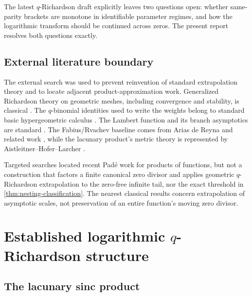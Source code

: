 \documentclass[11pt,oneside]{article}
\numberwithin{equation}{section}
\theoremstyle{frontier}
\theoremstyle{definition}
\theoremstyle{remark}
\begin{document}
\begin{resultbox}
The latest $q$-Richardson draft explicitly leaves two questions open: whether same-parity
brackets are monotone in identifiable parameter regimes, and how the logarithmic transform
should be continued across zeros.  The present report resolves both questions exactly.
\end{resultbox}

\subsection{External literature boundary}\label{sec:literature}

The external search was used to prevent reinvention of standard extrapolation theory and to
locate adjacent product-approximation work.  Generalized Richardson theory on geometric
meshes, including convergence and stability, is classical \cite{sidi1996,sidi-siam}.  The
$q$-binomial identities used to write the weights belong to standard basic hypergeometric
calculus \cite{gasper-rahman}.  The Lambert function and its branch asymptotics are standard
\cite{corless}.  The Fabius/Rvachev baseline comes from Arias de Reyna and related work
\cite{arias-function,arias-arithmetic,haugland}, while the lacunary product's metric theory
is represented by Aistleitner--Hofer--Larcher \cite{ahl2017}.

Targeted searches located recent Pad\'e work for products of functions, but not a construction
that factors a finite canonical zero divisor and applies geometric $q$-Richardson
extrapolation to the zero-free infinite tail, nor the exact threshold in
\cref{thm:nesting-classification}.  The nearest classical results concern extrapolation of
asymptotic scales, not preservation of an entire function's moving zero divisor.

\section{Established logarithmic \texorpdfstring{$q$}{q}-Richardson structure}\label{sec:baseline}

\subsection{The lacunary sinc product}
\end{document}
